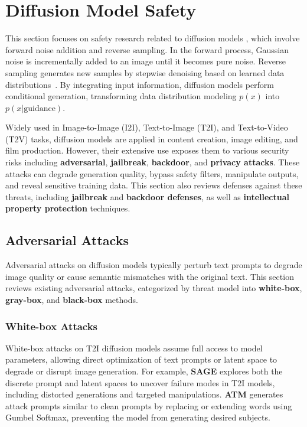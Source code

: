 \section{Diffusion Model Safety}\label{sec:diffusion}

This section focuses on safety research related to diffusion models \cite{rombach2022high, DALLE-2, DALLE-3, Imagen}, which involve forward noise addition and reverse sampling. In the forward process, Gaussian noise is incrementally added to an image until it becomes pure noise. Reverse sampling generates new samples by stepwise denoising based on learned data distributions~\cite{ho2020denoising, song2020denoising, song2020score}. By integrating input information, diffusion models perform conditional generation, transforming data distribution modeling \( p(x) \) into \( p(x|\text{guidance}) \).

Widely used in Image-to-Image (I2I), Text-to-Image (T2I), and Text-to-Video (T2V) tasks, diffusion models are applied in content creation, image editing, and film production. However, their extensive use exposes them to various security risks including \textbf{adversarial}, \textbf{jailbreak}, \textbf{backdoor}, and \textbf{privacy attacks}. These attacks can degrade generation quality, bypass safety filters, manipulate outputs, and reveal sensitive training data. This section also reviews defenses against these threats, including \textbf{jailbreak} and \textbf{backdoor defenses}, as well as \textbf{intellectual property protection} techniques.


\subsection{Adversarial Attacks}
\label{sec:dm_adversarial_attacks}

Adversarial attacks on diffusion models typically perturb text prompts to degrade image quality or cause semantic mismatches with the original text. This section reviews existing adversarial attacks, categorized by threat model into \textbf{white-box}, \textbf{gray-box}, and \textbf{black-box} methods.



\subsubsection{White-box Attacks}
White-box attacks on T2I diffusion models assume full access to model parameters, allowing direct optimization of text prompts or latent space to degrade or disrupt image generation. For example, \textbf{SAGE} \cite{liu2023discovering} explores both the discrete prompt and latent spaces to uncover failure modes in T2I models, including distorted generations and targeted manipulations. \textbf{ATM} \cite{du2024stable} generates attack prompts similar to clean prompts by replacing or extending words using Gumbel Softmax, preventing the model from generating desired subjects.


